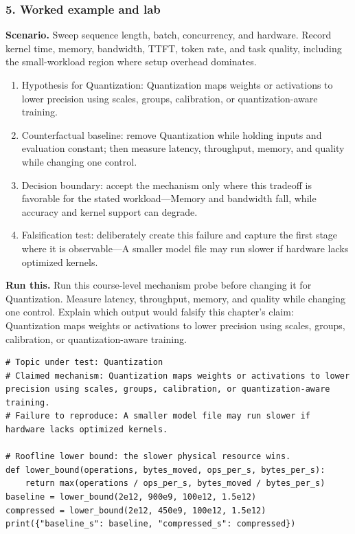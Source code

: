 \subsubsection*{5. Worked example and lab}
\textbf{Scenario.} Sweep sequence length, batch, concurrency, and hardware. Record kernel time, memory, bandwidth, TTFT, token rate, and task quality, including the small-workload region where setup overhead dominates.
\begin{enumerate}
\item Hypothesis for Quantization: Quantization maps weights or activations to lower precision using scales, groups, calibration, or quantization-aware training.
\item Counterfactual baseline: remove Quantization while holding inputs and evaluation constant; then measure latency, throughput, memory, and quality while changing one control.
\item Decision boundary: accept the mechanism only where this tradeoff is favorable for the stated workload—Memory and bandwidth fall, while accuracy and kernel support can degrade.
\item Falsification test: deliberately create this failure and capture the first stage where it is observable—A smaller model file may run slower if hardware lacks optimized kernels.
\end{enumerate}
\textbf{Run this.} Run this course-level mechanism probe before changing it for Quantization. Measure latency, throughput, memory, and quality while changing one control. Explain which output would falsify this chapter's claim: Quantization maps weights or activations to lower precision using scales, groups, calibration, or quantization-aware training.
\begin{Verbatim}[fontsize=\scriptsize]
# Topic under test: Quantization
# Claimed mechanism: Quantization maps weights or activations to lower precision using scales, groups, calibration, or quantization-aware training.
# Failure to reproduce: A smaller model file may run slower if hardware lacks optimized kernels.

# Roofline lower bound: the slower physical resource wins.
def lower_bound(operations, bytes_moved, ops_per_s, bytes_per_s):
    return max(operations / ops_per_s, bytes_moved / bytes_per_s)
baseline = lower_bound(2e12, 900e9, 100e12, 1.5e12)
compressed = lower_bound(2e12, 450e9, 100e12, 1.5e12)
print({"baseline_s": baseline, "compressed_s": compressed})
\end{Verbatim}
